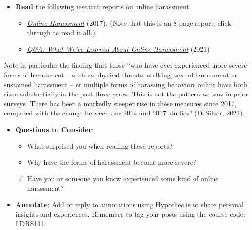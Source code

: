 \documentclass[
  letterpaper,
  DIV=11,
  numbers=noendperiod]{scrreprt}
\providecommand{\tightlist}{%
  \setlength{\itemsep}{0pt}\setlength{\parskip}{0pt}}\usepackage{longtable,booktabs,array}
\begin{document}
\begin{tcolorbox}[enhanced jigsaw, toprule=.15mm, colback=white, colframe=quarto-callout-note-color-frame, bottomtitle=1mm, leftrule=.75mm, coltitle=black, titlerule=0mm, rightrule=.15mm, colbacktitle=quarto-callout-note-color!10!white, left=2mm, title={Learning Activity}, opacitybacktitle=0.6, opacityback=0, breakable, toptitle=1mm, arc=.35mm, bottomrule=.15mm]

\begin{itemize}
\tightlist
\item
  \textbf{Read} the following research reports on online harassment.

  \begin{itemize}
  \tightlist
  \item
    \emph{\href{https://www.pewresearch.org/internet/2014/10/22/online-harassment/}{Online
    Harassment}} (2017). (Note that this is an 8-page report; click
    through to read it all.)
  \item
    \href{https://www.pewresearch.org/short-reads/2021/01/13/qa-what-weve-learned-about-online-harassment/}{\emph{Q\&A:
    What We've Learned About Online Harassment}} (2021)
  \end{itemize}
\end{itemize}

Note in particular the finding that those ``who have ever experienced
more severe forms of harassment -- such as physical threats, stalking,
sexual harassment or sustained harassment -- or multiple forms of
harassing behaviors online have both risen substantially in the past
three years. This is not the pattern we saw in prior surveys. There has
been a markedly steeper rise in these measures since 2017, compared with
the change between our 2014 and 2017 studies'' (DeSilver, 2021).

\begin{itemize}
\tightlist
\item
  \textbf{Questions to Consider}:

  \begin{itemize}
  \tightlist
  \item
    What surprised you when reading these reports?
  \item
    Why have the forms of harassment become more severe?
  \item
    Have you or someone you know experienced some kind of online
    harassment?
  \end{itemize}
\item
  \textbf{Annotate}: Add or reply to annotations using Hypothes.is to
  share personal insights and experiences. Remember to tag your posts
  using the course code: LDRS101.
\end{itemize}

\end{tcolorbox}
\end{document}
